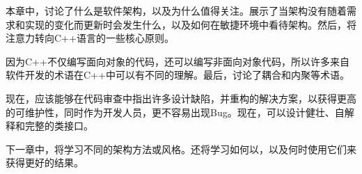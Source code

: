 本章中，讨论了什么是软件架构，以及为什么值得关注。展示了当架构没有随着需求和实现的变化而更新时会发生什么，以及如何在敏捷环境中看待架构。然后，将注意力转向C++语言的一些核心原则。

因为C++不仅编写面向对象的代码，还可以编写非面向对象代码，所以许多来自软件开发的术语在C++中可以有不同的理解。最后，讨论了耦合和内聚等术语。

现在，应该能够在代码审查中指出许多设计缺陷，并重构的解决方案，以获得更高的可维护性，同时作为开发人员，更不容易出现Bug。现在，可以设计健壮、自解释和完整的类接口。

下一章中，将学习不同的架构方法或风格。还将学习如何以，以及何时使用它们来获得更好的结果。